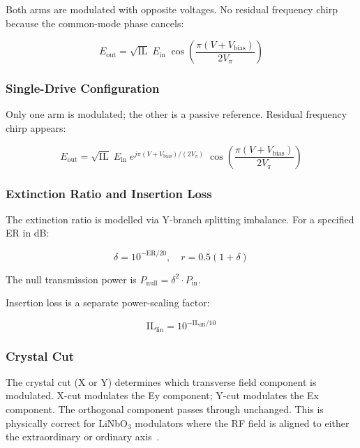 \documentclass[11pt,a4paper]{article}
\begin{document}
Both arms are modulated with opposite voltages.  No residual frequency chirp
because the common-mode phase cancels:

\begin{equation}
  E_{\text{out}} = \sqrt{\text{IL}} \; E_{\text{in}} \;
  \cos\!\left(\frac{\pi(V + V_{\text{bias}})}{2V_\pi}\right)
  \label{eq:mzm-pp}
\end{equation}

\subsubsection{Single-Drive Configuration}

Only one arm is modulated; the other is a passive reference.  Residual
frequency chirp appears:

\begin{equation}
  E_{\text{out}} = \sqrt{\text{IL}} \; E_{\text{in}} \;
  e^{j\pi(V + V_{\text{bias}})/(2V_\pi)} \;
  \cos\!\left(\frac{\pi(V + V_{\text{bias}})}{2V_\pi}\right)
  \label{eq:mzm-sd}
\end{equation}

\subsubsection{Extinction Ratio and Insertion Loss}

The extinction ratio is modelled via Y-branch splitting imbalance.
For a specified ER in dB:

\begin{equation}
  \delta = 10^{-\text{ER}/20}, \quad
  r = 0.5(1 + \delta)
\end{equation}

The null transmission power is $P_{\text{null}} = \delta^2 \cdot P_{\text{in}}$.

Insertion loss is a separate power-scaling factor:

\begin{equation}
  \text{IL}_{\text{lin}} = 10^{-\text{IL}_{\text{dB}}/10}
\end{equation}

\subsubsection{Crystal Cut}

The crystal cut (X or Y) determines which transverse field component is
modulated.  X-cut modulates the Ey component; Y-cut modulates the Ex
component.  The orthogonal component passes through unchanged.  This is
physically correct for LiNbO$_3$ modulators where the RF field is aligned
to either the extraordinary or ordinary axis~\cite{weis}.
\end{document}
